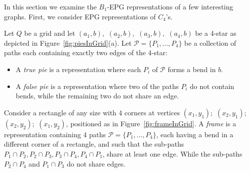 \documentclass[runningheads]{llncs}
\begin{document}

% 

In this section we examine the $B_1$-EPG representations of a few interesting graphs. First, we consider EPG representations of $C_4$'s.


\begin{definition} \label{defi:tortasFrame}

Let $ Q $ be a grid and let $ (a_1, b),$ $(a_2, b),$ $(a_3, b),$ $(a_4, b)$ be a 4-star as depicted in Figure~\ref{fig:piesInGrid}(a). Let $ \mathcal{P} = \{P_1, \dots , P_4\}$ be a collection of paths each containing exactly two edges of the $4$-star:

\begin{itemize}
\item A \emph{true pie} is a representation where each $P_i$ of $ \mathcal{P} $ forms a bend in $b$.

\item A \emph {false pie} is a representation where two of the paths $P_i$ do not contain bends, while the remaining two do not share an edge. 




\end{itemize}
\end{definition}

\begin{definition} \label{defi:tortasFrame2}
 Consider a rectangle of any size with 4 corners at vertices $ (x_1, y_1);$ $(x_2, y_1);$ $(x_2, y_2);$ $(x_1, y_2) $, positioned as in  Figure~\ref{fig:frameInGrid}. A \emph{frame} is a representation containing 4 paths $\mathcal{P} =  \{ P_1, \dots, P_4\} $, each having a bend in a different corner of a rectangle, and such that the  sub-paths $ P_1 \cap P_2, P_2 \cap P_3, P_3 \cap P_4, P_4 \cap P_1 $, share at least one edge. While the sub-paths $ P_2 \cap P_4 $ and $ P_1 \cap P_3 $ do not share edges.



\end{definition}
\end{document}
